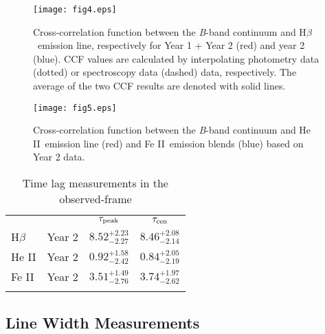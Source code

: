 \documentclass[iop]{emulateapj}
\newcommand{\Hb}{\rm H{$\beta$}}
\newcommand{\FeII}{Fe {\small II}}
\newcommand{\HeII}{He {\small II}}
\newcommand{\lagcen}{$\tau_{\rm cen}$}
\newcommand{\lagpeak}{$\tau_{\rm peak}$}
\begin{document}
\begin{figure}
	\texttt{[image: fig4.eps]}
	\caption{Cross-correlation function between the \textit{B}-band continuum and \Hb\ emission line, respectively for Year 1 + Year 2 (red) and year 2 (blue). CCF values are calculated by interpolating photometry data (dotted) or spectroscopy data (dashed) data, respectively. The average 
	of the two CCF results are denoted with solid lines.
		\label{fig3}}
\end{figure} 



\begin{figure}
	\texttt{[image: fig5.eps]}
	\caption{Cross-correlation function between the \textit{B}-band continuum and \HeII\ emission line (red) and \FeII\ emission blends (blue) 
	based on Year 2 data.
		\label{fig4}}
\end{figure} 


\begin{table}
	\centering
	\caption{Time lag measurements in the observed-frame}
	\begin{tabular}{llcc}
		\tableline\tableline
		 & & \lagpeak & \lagcen \\
		 \tableline
		\Hb & Year 2 & $8.52^{+2.23}_{-2.27}$ & $8.46^{+2.08}_{-2.14}$ \\ 
		\HeII & Year 2 & $0.92^{+1.58}_{-2.42}$ & $0.84^{+2.05}_{-2.19}$ \\
		\FeII & Year 2 & $3.51^{+1.49}_{-2.76}$ & $3.74^{+1.97}_{-2.62}$ \\
		\tableline
	\end{tabular}
	\label{table4}
\end{table}



\subsection{Line Width Measurements}
\end{document}

